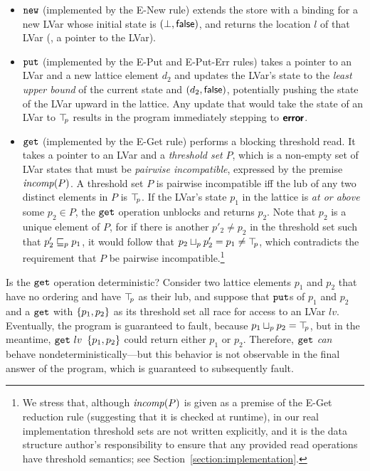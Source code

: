 \begin{itemize}
\item $\mbox{\texttt{new}}$ (implemented by the {\sc E-New} rule) extends the store
  with a binding for a new LVar whose initial state is $(\bot,
  \textsf{false})$, and returns the location $l$ of that LVar (\ie, a
  pointer to the LVar).
\item $\mbox{\texttt{put}}$ (implemented by the {\sc E-Put} and {\sc E-Put-Err}
  rules) takes a pointer to an LVar and a new lattice element $d_2$
  and updates the LVar's state to the {\em least upper bound} of the
  current state and $(d_2, \textsf{false})$, potentially pushing the
  state of the LVar upward in the lattice.  Any update that would take
  the state of an LVar to $\top\hspace{-0.85mm}_{p}$ results in the program immediately
  stepping to $\textbf{\textsf{error}}$.
\item $\mbox{\texttt{get}}$ (implemented by the {\sc E-Get} rule) performs a blocking threshold
  read.  It takes a pointer to an LVar and a \emph{threshold set} $P$, which is
  a non-empty set of LVar states that must be \emph{pairwise incompatible},
  expressed by the premise $\mathit{incomp}(P)$.  A threshold set $P$ is pairwise
  incompatible iff the lub of any two distinct elements in $P$ is $\top\hspace{-0.85mm}_{p}$.  If
  the LVar's state $p_1$ in the lattice is {\em at or above} some $p_2 \in P$,
  the $\mbox{\texttt{get}}$ operation unblocks and returns $p_2$.  Note that $p_2$ is a unique
  element of $P$, for if there is another $p'_2 \neq p_2$ in the threshold set
  such that $p'_2 \sqsubseteq_p p_1$, it would follow that $p_2 \sqcup_p p'_2 = p_1 \neq
  \top\hspace{-0.85mm}_{p}$, which contradicts the requirement that $P$ be pairwise
  incompatible.\footnote{We stress that, although $\mathit{incomp}(P)$ is given as a
    premise of the {\sc E-Get} reduction rule (suggesting that it is checked at
    runtime), in our real implementation threshold sets are not written
    explicitly, and it is the data structure author's responsibility to ensure
    that any provided read operations have threshold semantics; see
    Section~\ref{section:implementation}.}
\end{itemize}

\noindent
Is the $\mbox{\texttt{get}}$ operation
deterministic?  Consider two lattice elements $p_1$ and $p_2$ that have no
ordering and have $\top\hspace{-0.85mm}_{p}$ as their lub, and suppose that $\mbox{\texttt{put}}$s of $p_1$ and
$p_2$ and a $\mbox{\texttt{get}}$ with $\left\{p_1, p_2\right\}$ as its threshold set all race for
access to an LVar $lv$.  Eventually, the program is guaranteed to fault, because
$p_1 \sqcup_p p_2 = \top\hspace{-0.85mm}_{p}$, but in the meantime, $\mbox{\texttt{get}}~lv~\left\{p_1, p_2\right\}$
could return either $p_1$ or $p_2$.  Therefore, $\mbox{\texttt{get}}$ \emph{can} behave
nondeterministically---but this behavior is not observable in the final answer
of the program, which is guaranteed to subsequently fault.


